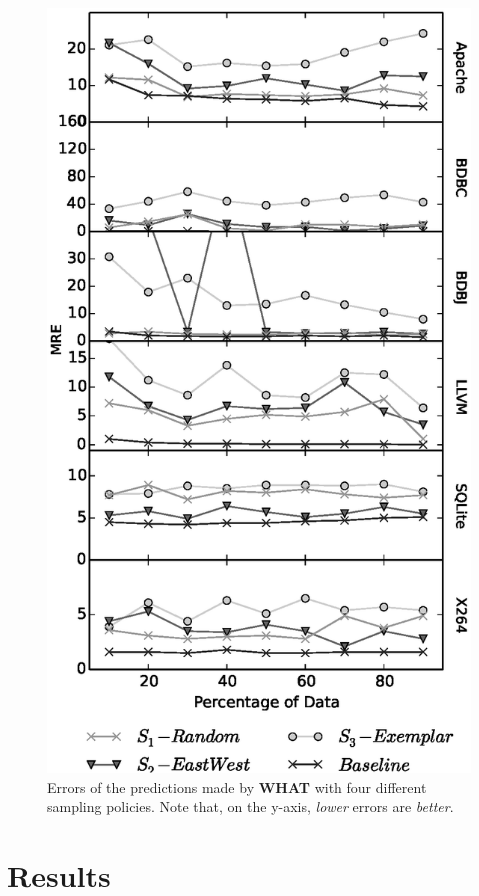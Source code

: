 \documentclass{newsig}
\newcommand{\what}{{\bf WHAT }}
\begin{document}
\begin{figure}[tbh]
\centering
\includegraphics[width=0.9\columnwidth]{Figures/SamplingAccuracy}
\caption{Errors of the predictions made by \what with four different
sampling policies. Note that, on the y-axis,  {\em lower} errors are {\em better}.
}
\label{fig:sampling_accuracy}
\end{figure}

\section{Results}
\end{document}
